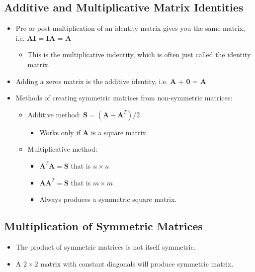 \documentclass[12pt,a4paper]{article}
\begin{document}
\subsection{Additive and Multiplicative Matrix Identities}
\begin{itemize}
    \item Pre or post multiplication of an identity matrix gives you the same matrix, i.e. \textbf{AI} = \textbf{IA} = \textbf{A}
        \begin{itemize}
            \item This is the {\color{o-Sun}multiplicative indentity}, which is often just called the identity matrix.
        \end{itemize}
    \item Adding a zeros matrix is the {\color{o-Sun}additive identity}, i.e. \textbf{A} + \textbf{0} = \textbf{A}
    \item Methods of creating symmetric matrices from non-symmetric matrices:
        \begin{itemize}
            \item Additive method: \(\textbf{S} = (\textbf{A}+\textbf{A}^T)/2\) 
                \begin{itemize}
                    \item Works only if \textbf{A} is a square matrix.
                \end{itemize}
            \item Multiplicative method: 
                \begin{itemize}
                    \item \(\textbf{A}^T\textbf{A}=\textbf{S}\) that is \(n\times n\)
                    \item \(\textbf{A}\textbf{A}^T=\textbf{S}\) that is \(m\times m\)
                    \item Always produces a {\color{o-Sun}symmetric square} matrix.
                \end{itemize}
        \end{itemize}
\end{itemize}

\subsection{Multiplication of Symmetric Matrices}
\begin{itemize}
    \item The product of symmetric matrices is not itself symmetric.
    \item A \(2\times2\) matrix with constant diagonals will produce symmetric matrix.
\end{itemize}
\newpage
\end{document}
